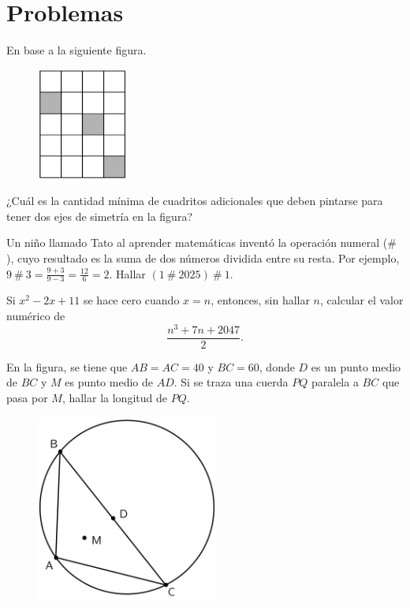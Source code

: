 \section{Problemas}

\begin{problem}
    En base a la siguiente figura.
    \begin{figure}[H]
        \centering
        \includegraphics[width=3cm]{content/figure1}
    \end{figure}
    ¿Cuál es la cantidad mínima de cuadritos adicionales que deben pintarse para tener dos ejes de simetría en la figura?
\end{problem}

\begin{problem}
    Un niño llamado Tato al aprender matemáticas inventó la operación numeral ($\#$), cuyo resultado es la suma de dos números dividida entre su resta.
    Por ejemplo, $9\ \#\ 3 = \frac{9 + 3}{9 - 3} = \frac{12}{6} = 2$.
    Hallar $(1\ \#\ 2025)\ \#\ 1$.
\end{problem}

\begin{problem}
    Si $x^2 - 2x + 11$ se hace cero cuando $x = n$, entonces, sin hallar $n$, calcular el valor numérico de
    \[
        \frac{n^3 + 7n + 2047}{2}.
    \]
\end{problem}

\begin{problem}
    En la figura, se tiene que $AB = AC = 40$ y $BC = 60$, donde $D$ es un punto medio de $BC$ y $M$ es punto medio de $AD$.
    Si se traza una cuerda $PQ$ paralela a $BC$ que pasa por $M$, hallar la longitud de $PQ$.
    \begin{figure}[H]
        \centering
        \includegraphics[width=6cm]{content/figure2}
    \end{figure}
\end{problem}

